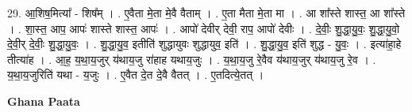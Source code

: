 \documentclass[17pt]{extarticle}
\begin{document}
29. आ॒शिष॒मित्या᳚ - शिष᳚म् । . ए॒वैता मे॒ता मे॒वै वैताम् । . ए॒ता मैता मे॒ता मा । . आ शा᳚स्ते शास्त॒ आ शा᳚स्ते । . शा॒स्त॒ आप॒ आपः॑ शास्ते शास्त॒ आपः॑ । . आपो॑ देवीर् देवी॒ राप॒ आपो॑ देवीः । . दे॒वीः॒ शु॒द्धा॒यु॒वः॒ शु॒द्धा॒यु॒वो॒ दे॒वी॒र् दे॒वीः॒ शु॒द्धा॒यु॒वः॒ । . शु॒द्धा॒यु॒व॒ इतीति॑ शुद्धायुवः शुद्धायुव॒ इति॑ । . शु॒द्धा॒यु॒व॒ इति॑ शुद्ध - यु॒वः॒ । . इत्या॑हा॒हे तीत्या॑ह । . आ॒ह॒ य॒था॒य॒जुर् य॑थाय॒जु रा॑हाह यथाय॒जुः । . य॒था॒य॒जु रे॒वैव य॑थाय॒जुर् य॑थाय॒जु रे॒व । . य॒था॒य॒जुरिति॑ यथा - य॒जुः । . ए॒वैत दे॒त दे॒वै वैतत् । . ए॒तदित्ये॒तत् । \newline

\textbf{Ghana Paata } \newline
\end{document}
